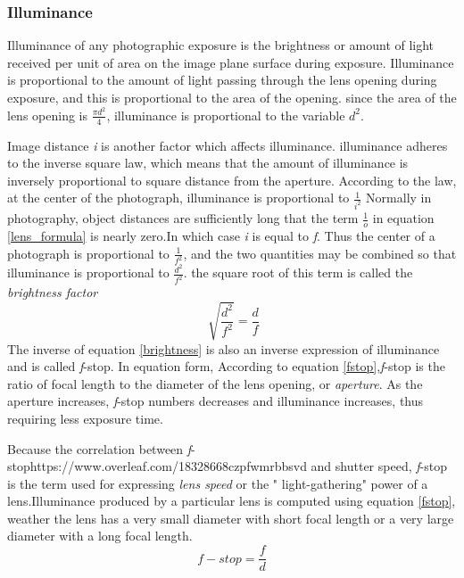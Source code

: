\subsubsection{Illuminance}
Illuminance of any photographic exposure is the brightness or amount of light received per unit of area on the image plane surface during exposure.
Illuminance is proportional to the amount of light passing through the lens opening during exposure, and this is proportional to the area of the opening. since the area of the lens opening is $\frac{\pi d^2}{4}$, illuminance is proportional to the variable $d^2$.\cite{elements_photogrammetry}

Image distance \textit{i} is another factor which affects illuminance. illuminance adheres to the inverse square law, which means that the amount of illuminance is inversely proportional to square distance from the aperture. According to the law, at the center of the photograph, illuminance is proportional to $\frac{1}{i^2}$ Normally in photography, object distances are sufficiently long that the term $\frac{1}{o}$ in equation \ref{lens_formula} is nearly zero.In which case \textit{i} is equal to \textit{f}. Thus the center of a photograph is proportional to $\frac{1}{f^2}$, and the two quantities may be combined so that illuminance is proportional to $\frac{d^2}{f^2}$. the square root of this term is called the \textit{brightness factor}\cite{elements_photogrammetry}
\begin{equation}
\sqrt[]{\frac{d^2}{f^2}}=\frac{d}{f}
\label{brightness}
\end{equation}
The inverse of equation \ref{brightness} is also an inverse expression of illuminance and is called \textit{f}-stop. In equation form, According to equation \ref{fstop},\textit{f}-stop is the ratio of focal length to the diameter of the lens opening, or \textit{aperture}. As the aperture increases, \textit{f}-stop numbers decreases and illuminance increases, thus requiring less exposure time.\cite{elements_photogrammetry}

Because the correlation between \textit{f}-stophttps://www.overleaf.com/18328668czpfwmrbbsvd and shutter speed, \textit{f}-stop is the term used for expressing \textit{lens speed} or the " light-gathering" power of a lens.Illuminance produced by a particular lens is computed using equation \ref{fstop}, weather the lens has a very small diameter with short focal length or a very large diameter with a long focal length.\cite{elements_photogrammetry}
\begin{equation}
f-stop=\frac{f}{d}
\label{fstop}
\end{equation}
